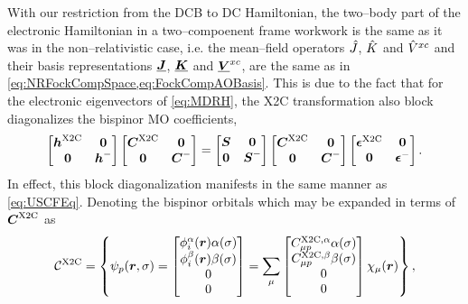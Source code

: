 With our restriction from the DCB to DC Hamiltonian,
the two--body part of the electronic Hamiltonian in a two--compoenent frame workwork
is the same as it was in the non--relativistic case, i.e. the mean--field operators
$\hat{J}$, $\hat{K}$ and $\hat{V}^{xc}$ and their basis representations $\boldsymbol{\underline{J}}$, $\boldsymbol{\underline{K}}$ and $\boldsymbol{\underline{V}}^{xc}$, are the same as in 
\cref{eq:NRFockCompSpace,eq:FockCompAOBasis}. This is due to the fact that for the electronic
eigenvectors of \cref{eq:MDRH}, the X2C transformation also block diagonalizes the 
bispinor MO coefficients,
\begin{equation}
\begin{bmatrix} \boldsymbol{h}^{\mathrm{X2C}} & \boldsymbol{0} \\ \boldsymbol{0} & \boldsymbol{h}^- \end{bmatrix}
\begin{bmatrix} \boldsymbol{C}^{\mathrm{X2C}} & \boldsymbol{0} \\ \boldsymbol{0} & \boldsymbol{C}^- \end{bmatrix} =
\begin{bmatrix} \boldsymbol{S} & \boldsymbol{0} \\ \boldsymbol{0} & \boldsymbol{S}^- \end{bmatrix}
\begin{bmatrix} \boldsymbol{C}^{\mathrm{X2C}} & \boldsymbol{0} \\ \boldsymbol{0} & \boldsymbol{C}^- \end{bmatrix} 
\begin{bmatrix} \boldsymbol{\epsilon}^{\mathrm{X2C}} & \boldsymbol{0} \\ \boldsymbol{0} & \boldsymbol{\epsilon}^- \end{bmatrix}.
\end{equation}
In effect, this block diagonalization manifests in the same manner as \cref{eq:USCFEq}. 
Denoting the bispinor orbitals which may be expanded in terms of 
$\boldsymbol{C}^{\mathrm{X2C}}$ as
\begin{equation}
  \mathcal C^{\mathrm{X2C}} = \left\lbrace
  \psi_p(\boldsymbol{r}, \sigma) = 
  \begin{bmatrix} \phi^\alpha_i (\boldsymbol{r}) \alpha(\sigma) \\ \phi^\beta_i(\boldsymbol{r}) \beta(\sigma) \\ 0 \\ 0 \end{bmatrix} =
  \sum_\mu \begin{bmatrix} C_{\mu p}^{\mathrm{X2C},\alpha} \alpha(\sigma)\\ C_{\mu p}^{\mathrm{X2C},\beta}\beta(\sigma) \\ 0 \\ 0 \end{bmatrix} \chi_\mu(\boldsymbol{r}) \right\rbrace, 
\end{equation}
